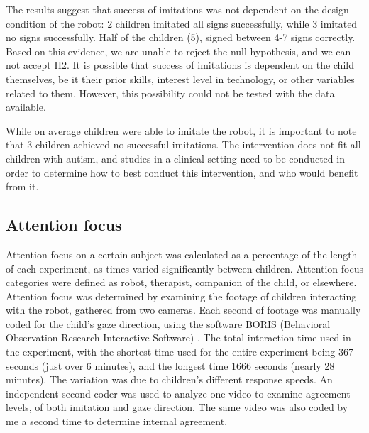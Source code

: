 The results suggest that success of imitations was not dependent on the design condition of the robot: 2 children imitated all signs successfully, while 3 imitated no signs successfully. Half of the children (5), signed between 4-7 signs correctly. Based on this evidence, we are unable to reject the null hypothesis, and we can not accept H2. It is possible that success of imitations is dependent on the child themselves, be it their prior skills, interest level in technology, or other variables related to them. However, this possibility could not be tested with the data available.

While on average children were able to imitate the robot, it is important to note that 3 children achieved no successful imitations. The intervention does not fit all children with autism, and studies in a clinical setting need to be conducted in order to determine how to best conduct this intervention, and who would benefit from it.


\subsection{Attention focus}

Attention focus on a certain subject was calculated as a percentage of the length of each experiment, as times varied significantly between children. Attention focus categories were defined as robot, therapist, companion of the child, or elsewhere. Attention focus was determined by examining the footage of children interacting with the robot, gathered from two cameras. Each second of footage was manually coded for the child's gaze direction, using the software BORIS (Behavioral Observation Research Interactive Software) \cite{boris}. The total interaction time used in the experiment, with the shortest time used for the entire experiment being 367 seconds (just over 6 minutes), and the longest time 1666 seconds (nearly 28 minutes). The variation was due to children's different response speeds. An independent second coder was used to analyze one video to examine agreement levels, of both imitation and gaze direction. The same video was also coded by me a second time to determine internal agreement.

